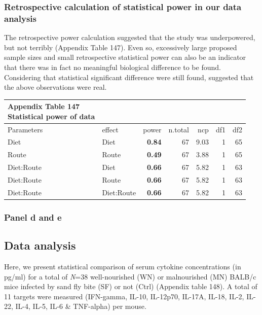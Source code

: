 \documentclass[
  12pt,
  letterpaper,
]{article}
\begin{document}
\subsubsection{Retrospective calculation of statistical power in our data analysis}\label{retrospective-calculation-of-statistical-power-in-our-data-analysis-3}

The retrospective power calculation suggested that the study was underpowered, but not terribly (Appendix Table 147). Even so, excessively large proposed sample sizes and small retrospective statistical power can also be an indicator that there was in fact no meaningful biological difference to be found. Considering that statistical significant difference were still found, suggested that the above observations were real.

\begingroup
\fontsize{12.0pt}{14.4pt}\selectfont
\begin{longtable}{l|lrrrrr}
\caption*{
{\large \textbf{Appendix Table 147}} \\ 
{\small \textbf{Statistical power of data}}
} \\ 
\toprule
Parameters & {effect} & {power} & {n.total} & {ncp} & {df1} & {df2} \\ 
\midrule\addlinespace[2.5pt]
Diet & Diet & {\bfseries 0.84} & 67 & 9.03 & 1 & 65 \\ 
Route & Route & {\bfseries 0.49} & 67 & 3.88 & 1 & 65 \\ 
Diet:Route & Diet & {\bfseries 0.66} & 67 & 5.82 & 1 & 63 \\ 
Diet:Route & Route & {\bfseries 0.66} & 67 & 5.82 & 1 & 63 \\ 
Diet:Route & Diet:Route & {\bfseries 0.66} & 67 & 5.82 & 1 & 63 \\ 
\bottomrule
\end{longtable}
\endgroup

\subsubsection{Panel d and e}\label{panel-d-and-e}

\subsection{Data analysis}\label{data-analysis-9}

Here, we present statistical comparison of serum cytokine concentrations (in pg/ml) for a total of \emph{N}=38 well-nourished (WN) or malnourished (MN) BALB/c mice infected by sand fly bite (SF) or not (Ctrl) (Appendix table 148). A total of 11 targets were measured (IFN-gamma, IL-10, IL-12p70, IL-17A, IL-18, IL-2, IL-22, IL-4, IL-5, IL-6 \& TNF-alpha) per mouse.
\end{document}
